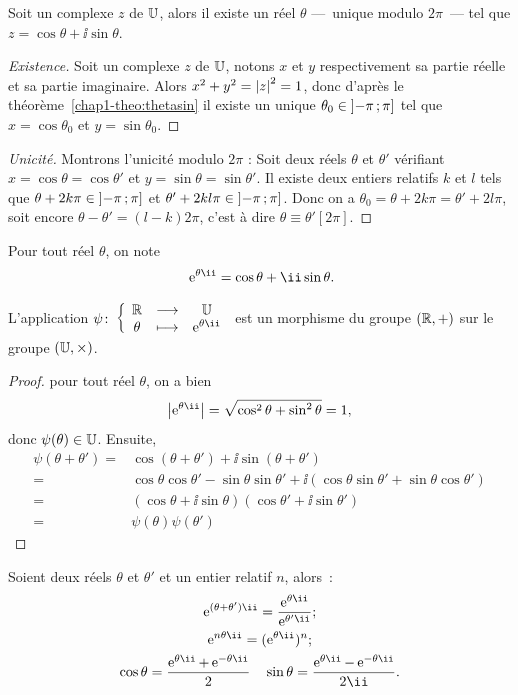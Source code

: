 %
\begin{prop}\label{prop:expsurj}
  Soit un complexe $z$ de $\mathbb{U}$, alors il existe un réel $\theta$ ---~unique modulo $2\pi$~--- tel que $z=\cos\theta +\ii\sin\theta$. 
\end{prop}
\begin{proof}[Existence]
  Soit un complexe $z$ de $\mathbb{U}$, notons $x$ et $y$ respectivement sa partie réelle et sa partie imaginaire. Alors $x^2+y^2=\left\lvert z\right\rvert^2=1$, donc d'après le théorème~\ref{chap1-theo:thetasin} il existe un unique $\theta_0 \in \left] -\pi \, ;  \pi \right]$ tel que $x=\cos\theta_0$ et $y=\sin\theta_0$.
\end{proof}
\begin{proof}[Unicité]
  Montrons l'unicité modulo $2\pi$ : Soit deux réels $\theta$ et $\theta'$ vérifiant  $x=\cos \theta=\cos \theta'$ et $y=\sin \theta = \sin \theta'$. Il existe deux entiers relatifs $k$ et $l$ tels que $\theta +2k \pi \in \left] -\pi \, ;  \pi \right]$ et $\theta' +2kl \pi \in \left] -\pi \, ;  \pi \right]$. Donc on a $\theta_0=\theta + 2k \pi=\theta'+2l \pi$, soit encore $\theta-\theta'=(l-k) 2\pi$, c'est à dire $\theta \equiv \theta' [2\pi]$.
\end{proof}
%
\begin{defdef}
  Pour tout réel $\theta$, on note 
  \begin{equation}\
    \expc{}{\theta}=\cos\theta +\ii\sin\theta.
  \end{equation}
\end{defdef}
%
\begin{prop}
  L'application $\fonction{\psi}{\R}{\U}{\theta}{\expc{}{\theta}}$ est un morphisme du groupe $(\mathbb{R},+)$ sur le groupe $(\mathbb{U},\times)$.
\end{prop}
\begin{proof} 
  pour tout réel $\theta$, on a bien
  \begin{equation}
    \abs{\expc{}{\theta}}=\sqrt{\cos^2 \theta + \sin^2 \theta}=1,
  \end{equation}
  donc $\psi(\theta) \in \mathbb{U}$. Ensuite, 
  \begin{align}
    \psi(\theta +\theta') = &\cos(\theta +\theta') + \ii \sin(\theta + \theta')\\ 
    =&\cos \theta \cos \theta' - \sin \theta \sin \theta' +\ii(\cos \theta \sin \theta' + \sin \theta \cos \theta')\\
    =&(\cos \theta + \ii \sin \theta)(\cos \theta' + \ii \sin \theta')\\
    =&\psi(\theta) \psi(\theta')
  \end{align}
\end{proof}
%
\begin{prop} Soient deux réels $\theta$ et $\theta'$ et un entier relatif $n$, alors~:
  \begin{gather}
    \expc{}{(\theta+\theta')}=\frac{\expc{}{\theta}}{\expc{}{\theta'}};\\
    \expc{}{n \theta}=(\expc{}{\theta})^n;\\
    \cos \theta = \frac{\expc{}{\theta}+\expc{}{-\theta}}{2} \quad \sin \theta = \frac{\expc{}{\theta}-\expc{}{-\theta}}{2\ii}.
  \end{gather}
\end{prop}

